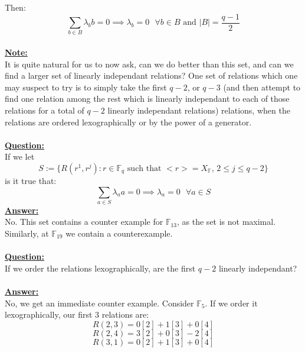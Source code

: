 \documentclass[11pt]{article}
\theoremstyle{plain}
\theoremstyle{definition}
\begin{document}
Then:
\begin{equation*}
\sum_{b \in B} \lambda_b b = 0 \implies \lambda_b=0 \text{ } \forall  b \in B \text{ and } |B| = \frac{q-1}{2}
\end{equation*}
\\
\textbf{\underline{Note:}}\\ It is quite natural for us to now ask, can we do better than this set, and can we find a larger set of linearly independant relations? One set of relations which one may suspect to try is to simply take the first $q-2$, or $q-3$ (and then attempt to find one relation among the rest which is linearly independant to each of those relations for a total of $q-2$ linearly independant relations) relations, when the relations are ordered lexographically or by the power of a generator.\\
\\
\textbf{\underline{Question:}}\\ If we let
\begin{equation*}
S:= \{R(r^1, r^j) : r \in \mathbb{F}_q \text{ such that } <r> = X_{\mathbb{F}} \text{, } 2 \leq j \leq q-2\}
\end{equation*}
is it true that:
\begin{equation*} 
\sum_{a \in S} \lambda_a a = 0 \implies \lambda_a=0 \text{ } \forall  a \in S
\end{equation*}
\textbf{\underline{Answer:}} \\ No. This set contains a counter example for $\mathbb{F}_{13}$, as the set is not maximal. Similarly, at $\mathbb{F}_{19}$ we contain a counterexample.\\
\\
\textbf{\underline{Question:}}\\ If we order the relations lexographically, are the first $q-2$ linearly independant? \\
\\
\textbf{\underline{Answer:}} \\ No, we get an immediate counter example. Consider $\mathbb{F}_5$. If we order it lexographically, our first $3$ relations are:
\begin{equation*}
R(2,3) = 0[2] + 1[3] + 0[4] 
\end{equation*}
\begin{equation*}
R(2,4) = 3[2] + 0[3] - 2[4]
\end{equation*}
\begin{equation*}
R(3,1) = 0[2] + 1[3] + 0[4]  
\end{equation*}
\end{document}

